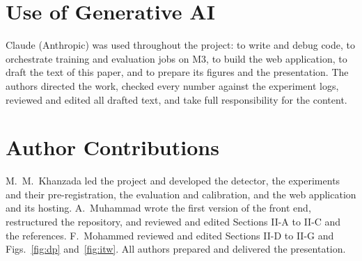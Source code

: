 \documentclass[journal]{IEEEtran}
\begin{document}
\section*{Use of Generative AI}
Claude (Anthropic) was used throughout the project: to write and debug code,
to orchestrate training and evaluation jobs on M3, to build the web
application, to draft the text of this paper, and to prepare its figures and
the presentation. The authors directed the work, checked every number against
the experiment logs, reviewed and edited all drafted text, and take full
responsibility for the content.

\section*{Author Contributions}
M.~M.~Khanzada led the project and developed the detector, the experiments
and their pre-registration, the evaluation and calibration, and the web
application and its hosting. A.~Muhammad wrote the first version of the front
end, restructured the repository, and reviewed and edited Sections II-A to
II-C and the references. F.~Mohammed reviewed and edited Sections II-D to II-G
and Figs.~\ref{fig:dp} and~\ref{fig:itw}. All authors prepared and delivered
the presentation.



\end{document}
